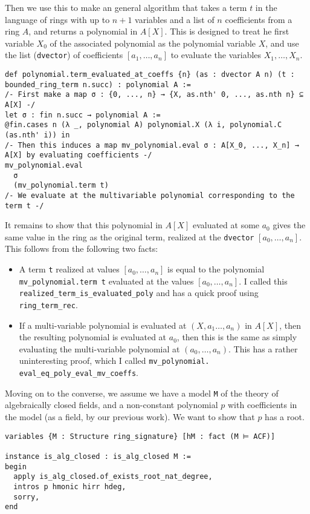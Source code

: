 Then we use this to make an general algorithm that takes
a term $t$ in the language of rings with up to $n + 1$ variables
and a list of $n$ coefficients from a ring $A$,
and returns a polynomial in $A[X]$.
This is designed to treat he first variable $X_{0}$ of the associated polynomial
as the polynomial variable $X$,
and use the list (\texttt{dvector}) of coefficients
$[a_{1},\dots,a_{n}]$ to evaluate the variables $X_{1},\dots,X_{n}$.

\begin{lstlisting}
def polynomial.term_evaluated_at_coeffs {n} (as : dvector A n) (t : bounded_ring_term n.succ) : polynomial A :=
/- First make a map σ : {0, ..., n} → {X, as.nth' 0, ..., as.nth n} ⊆ A[X] -/
let σ : fin n.succ → polynomial A :=
@fin.cases n (λ _, polynomial A) polynomial.X (λ i, polynomial.C (as.nth' i)) in
/- Then this induces a map mv_polynomial.eval σ : A[X_0, ..., X_n] → A[X] by evaluating coefficients -/
mv_polynomial.eval
  σ
  (mv_polynomial.term t)
/- We evaluate at the multivariable polynomial corresponding to the term t -/
\end{lstlisting}

It remains to show that this polynomial in $A[X]$
evaluated at some $a_{0}$ gives the same value in the ring as the original term,
realized at the \texttt{dvector} $[a_{0},\dots,a_{n}]$.
This follows from the following two facts:
\begin{itemize}
  \item A term \texttt{t} realized at values $[a_{0},\dots,a_{n}]$ is equal to
        the polynomial \texttt{mv\_polynomial.term t}
        evaluated at the values $[a_{0},\dots,a_{n}]$.
        I called this \texttt{realized\_term\_is\_evaluated\_poly}
        and has a quick proof using \texttt{ring\_term\_rec}.
  \item If a multi-variable polynomial is evaluated at $(X,a_{1}\dots,a_{n})$
        in $A[X]$, then the resulting polynomial is evaluated at $a_{0}$,
        then this is the same as simply evaluating the multi-variable polynomial
        at $(a_{0},\dots,a_{n})$.
        This has a rather uninteresting proof,
        which I called \texttt{mv\_polynomial. eval\_eq\_poly\_eval\_mv\_coeffs}.
\end{itemize}

Moving on to the converse, we assume we have a model \texttt{M} of the theory
of algebraically closed fields, and a non-constant polynomial $p$
with coefficients in the model (as a field, by our previous work).
We want to show that $p$ has a root.
\begin{lstlisting}
variables {M : Structure ring_signature} [hM : fact (M ⊨ ACF)]

instance is_alg_closed : is_alg_closed M :=
begin
  apply is_alg_closed.of_exists_root_nat_degree,
  intros p hmonic hirr hdeg,
  sorry,
end\end{lstlisting}


